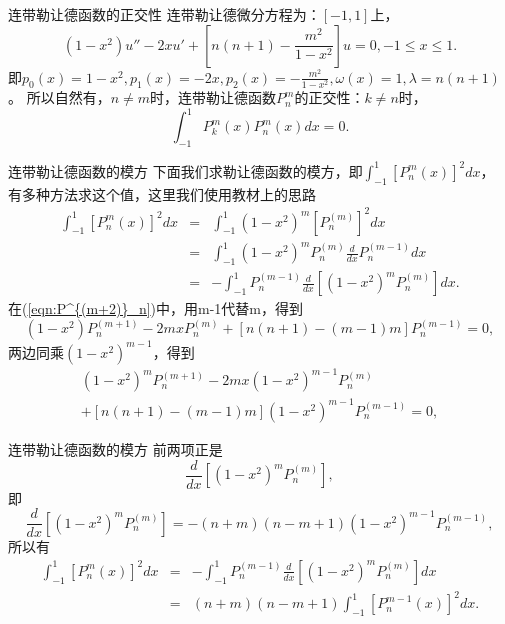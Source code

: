 \documentclass[11pt]{beamer}
\begin{document}
\begin{frame}{连带勒让德函数的正交性}
连带勒让德微分方程为：$[-1,1]$上，
\begin{equation}
(1-x^2) u'' - 2x u' + [n(n+1) - \frac{m^2}{1-x^2}] u = 0, -1 \leq x \leq 1.
\end{equation}
即$p_0 (x) = 1-x^2, p_1(x) = -2x, p_2(x) = - \frac{m^2}{1-x^2}, \omega(x) = 1, \lambda = n(n+1)$。
所以自然有，$n\neq m$时，连带勒让德函数$P^m_n$的正交性：$k \neq n$时，
\begin{equation}
\int^1_{-1} P^m_k(x) P^m_n(x) dx = 0.
\end{equation}
\end{frame}

\begin{frame}{连带勒让德函数的模方}
下面我们求勒让德函数的模方，即$\int^1_{-1} [ P^m_n(x) ]^2 dx$，
有多种方法求这个值，这里我们使用教材上的思路
\begin{eqnarray}
\int^1_{-1} [ P^m_n(x) ]^2 dx &=& \int^1_{-1} (1-x^2)^m [ P^{(m)}_n ]^2 dx
\nonumber\\
&=& \int^1_{-1} (1-x^2)^m P^{(m)}_n \frac{d}{dx}P^{(m-1)}_n dx
\nonumber\\
&=& - \int^1_{-1} P^{(m-1)}_n \frac{d}{dx}[ (1-x^2)^m P^{(m)}_n ] dx.
\end{eqnarray}
在(\ref{eqn:P^{(m+2)}_n})中，用m-1代替m，得到
\begin{equation}
(1-x^2)P^{(m+1)}_n - 2mxP^{(m)}_n + [ n(n+1) - (m-1)m ] P^{(m-1)}_n = 0,
\end{equation}
两边同乘$(1-x^2)^{m-1}$，得到
\begin{eqnarray}
(1-x^2)^m P^{(m+1)}_n - 2mx(1-x^2)^{m-1} P^{(m)}_n 
\nonumber \\
+ [ n(n+1) - (m-1)m ](1-x^2)^{m-1} P^{(m-1)}_n = 0,
\end{eqnarray}
\end{frame}

\begin{frame}{连带勒让德函数的模方}
前两项正是
\begin{equation}
\frac{d}{dx} [ (1-x^2)^m P^{(m)}_n ],
\end{equation}
即
\begin{equation}
\frac{d}{dx} [ (1-x^2)^m P^{(m)}_n ] = - (n+m)(n-m+1)(1-x^2)^{m-1} P^{(m-1)}_n,
\end{equation}
所以有
\begin{eqnarray}
\int^1_{-1} [ P^m_n(x) ]^2 dx &=& - \int^1_{-1} P^{(m-1)}_n \frac{d}{dx}[ (1-x^2)^m P^{(m)}_n ] dx \nonumber\\
&=& (n+m)(n-m+1) \int^1_{-1} [P^{m-1}_n(x) ]^2 dx.
\end{eqnarray}
\end{frame}
\end{document}
